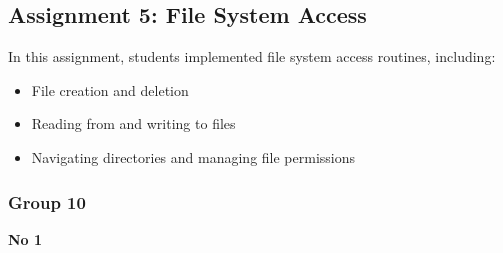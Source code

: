\documentclass[12pt]{article}
\begin{document}
\subsection{Assignment 5: File System Access}
In this assignment, students implemented file system access routines, including:
\begin{itemize}
    \item File creation and deletion
    \item Reading from and writing to files
    \item Navigating directories and managing file permissions
\end{itemize}
\subsubsection{Group 10}



\textbf{No 1}
\end{document}
